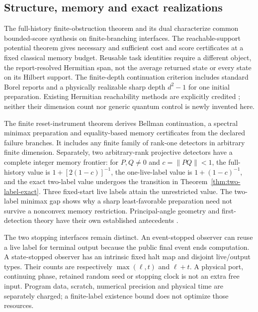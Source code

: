 \subsection*{Structure, memory and exact realizations}
The full-history finite-obstruction theorem and its dual characterize common bounded-score synthesis on finite-branching interfaces. The reachable-support potential theorem gives necessary and sufficient cost and score certificates at a fixed classical memory budget. Reusable task identities require a different object, the report-resolved Hermitian span, not the average returned state or every state on its Hilbert support. The finite-depth continuation criterion includes standard Borel reports and a physically realizable sharp depth $d^2-1$ for one initial preparation. Existing Hermitian reachability methods are explicitly credited \cite{Tzeng92,Fu24}; neither their dimension count nor generic quantum control is newly invented here.

The finite reset-instrument theorem derives Bellman continuation, a spectral minimax preparation and equality-based memory certificates from the declared failure branches. It includes any finite family of rank-one detectors in arbitrary finite dimension. Separately, two arbitrary-rank projective detectors have a complete integer memory frontier: for $P,Q\ne0$ and $c=\|PQ\|<1$, the full-history value is $1+[2(1-c)]^{-1}$, the one-live-label value is $1+(1-c)^{-1}$, and the exact two-label value undergoes the transition in Theorem~\ref{thm:two-label-exact}. Three fixed-start live labels attain the unrestricted value. The two-label minimax gap shows why a sharp least-favorable preparation need not survive a nonconvex memory restriction. Principal-angle geometry and first-detection theory have their own established antecedents \cite{Halmos69,Kessler21,DelVecchio26}.

The two stopping interfaces remain distinct. An event-stopped observer can reuse a live label for terminal output because the public final event ends computation. A state-stopped observer has an intrinsic fixed halt map and disjoint live/output types. Their counts are respectively $\max(\ell,t)$ and $\ell+t$. A physical port, continuing phase, retained random seed or stopping clock is not an extra free input. Program data, scratch, numerical precision and physical time are separately charged; a finite-label existence bound does not optimize those resources.

